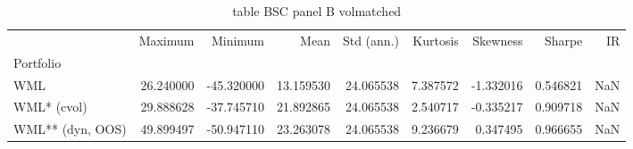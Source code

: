 \begin{table}[htbp]
  \centering
  \caption{table BSC panel B volmatched}
  \label{tab:table_BSC_panel_B_volmatched}
  \begin{tabular}{lrrrrrrrr}
\toprule
 & Maximum & Minimum & Mean & Std (ann.) & Kurtosis & Skewness & Sharpe & IR \\
Portfolio &  &  &  &  &  &  &  &  \\
\midrule
WML & 26.240000 & -45.320000 & 13.159530 & 24.065538 & 7.387572 & -1.332016 & 0.546821 & NaN \\
WML* (cvol) & 29.888628 & -37.745710 & 21.892865 & 24.065538 & 2.540717 & -0.335217 & 0.909718 & NaN \\
WML** (dyn, OOS) & 49.899497 & -50.947110 & 23.263078 & 24.065538 & 9.236679 & 0.347495 & 0.966655 & NaN \\
\bottomrule
\end{tabular}

\end{table}
